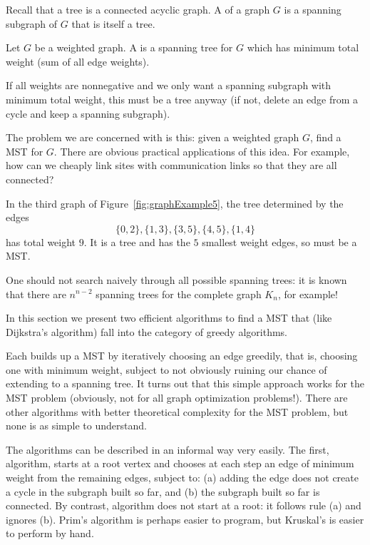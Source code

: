 Recall that a tree is a connected acyclic graph. A  of a graph $G$ is a spanning subgraph of $G$ that is itself a
tree. 

\begin{Definition}
Let $G$ be a weighted graph. A 
is a spanning tree for $G$ which has minimum total weight (sum of all edge weights). 

\end{Definition}
\begin{note}If all weights are nonnegative and we
only want a spanning subgraph with minimum total weight, this must be a
tree anyway (if not, delete an edge from a cycle and keep a spanning
subgraph).
\end{note}

The problem we are concerned with is this: given a weighted graph $G$,
find a MST for $G$. There are obvious practical applications of this
idea. For example, how can we cheaply link sites with communication
links so that they are all connected?

\begin{Example}
In the third graph of Figure~\ref{fig:graphExample5}, the tree
determined by the edges 
$$\{0, 2\}, \{1, 3\}, \{3, 5\}, \{4, 5\}, \{1,
4\}$$ 
has total weight $9$. It is a tree and has the $5$ smallest weight
edges, so must be a MST.

\end{Example}

One should not search naively through all possible spanning trees: it is
known that there are $n^{n-2}$ spanning trees for the complete graph
$K_n$, for example!

In this section we present two efficient algorithms to find a MST that
(like Dijkstra's algorithm) fall into the category of greedy algorithms. 

Each builds up a MST by iteratively choosing an edge greedily, that is,
choosing one with minimum weight, subject to not obviously ruining our
chance of extending to a spanning tree. It turns out that this simple
approach works for the MST problem (obviously, not for all graph
optimization problems!). There are other algorithms with better
theoretical complexity for the MST problem, but none is as simple to
understand.

The algorithms can be described in an informal way very easily. The
first,  algorithm, starts at a root vertex and chooses
at each step an edge of minimum weight from the remaining edges, subject
to: (a) adding the edge does not create a cycle in the subgraph built so
far, and (b) the subgraph built so far is connected. By contrast,
 algorithm does not start at a root: it follows
rule (a) and ignores (b). Prim's algorithm is perhaps easier to program,
but Kruskal's is easier to perform by hand.

